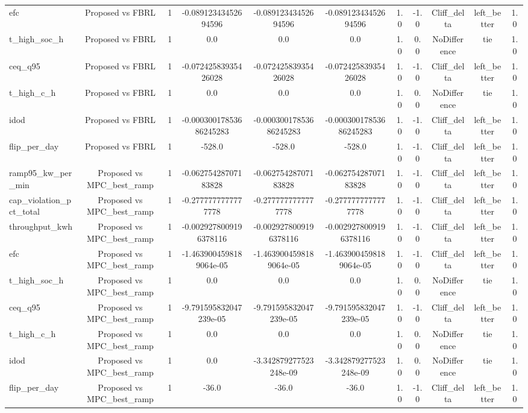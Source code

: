 \begin{table}[t]
\begin{tabular}{lcccccccccc}
efc & Proposed vs FBRL & 1 & -0.08912343452694596 & -0.08912343452694596 & -0.08912343452694596 & 1.0 & -1.0 & Cliff\_delta & left\_better & 1.0 \\
t\_high\_soc\_h & Proposed vs FBRL & 1 & 0.0 & 0.0 & 0.0 & 1.0 & 0.0 & NoDifference & tie & 1.0 \\
ceq\_q95 & Proposed vs FBRL & 1 & -0.07242583935426028 & -0.07242583935426028 & -0.07242583935426028 & 1.0 & -1.0 & Cliff\_delta & left\_better & 1.0 \\
t\_high\_c\_h & Proposed vs FBRL & 1 & 0.0 & 0.0 & 0.0 & 1.0 & 0.0 & NoDifference & tie & 1.0 \\
idod & Proposed vs FBRL & 1 & -0.00030017853686245283 & -0.00030017853686245283 & -0.00030017853686245283 & 1.0 & -1.0 & Cliff\_delta & left\_better & 1.0 \\
flip\_per\_day & Proposed vs FBRL & 1 & -528.0 & -528.0 & -528.0 & 1.0 & -1.0 & Cliff\_delta & left\_better & 1.0 \\
ramp95\_kw\_per\_min & Proposed vs MPC\_best\_ramp & 1 & -0.06275428707183828 & -0.06275428707183828 & -0.06275428707183828 & 1.0 & -1.0 & Cliff\_delta & left\_better & 1.0 \\
cap\_violation\_pct\_total & Proposed vs MPC\_best\_ramp & 1 & -0.2777777777777778 & -0.2777777777777778 & -0.2777777777777778 & 1.0 & -1.0 & Cliff\_delta & left\_better & 1.0 \\
throughput\_kwh & Proposed vs MPC\_best\_ramp & 1 & -0.0029278009196378116 & -0.0029278009196378116 & -0.0029278009196378116 & 1.0 & -1.0 & Cliff\_delta & left\_better & 1.0 \\
efc & Proposed vs MPC\_best\_ramp & 1 & -1.4639004598189064e-05 & -1.4639004598189064e-05 & -1.4639004598189064e-05 & 1.0 & -1.0 & Cliff\_delta & left\_better & 1.0 \\
t\_high\_soc\_h & Proposed vs MPC\_best\_ramp & 1 & 0.0 & 0.0 & 0.0 & 1.0 & 0.0 & NoDifference & tie & 1.0 \\
ceq\_q95 & Proposed vs MPC\_best\_ramp & 1 & -9.791595832047239e-05 & -9.791595832047239e-05 & -9.791595832047239e-05 & 1.0 & -1.0 & Cliff\_delta & left\_better & 1.0 \\
t\_high\_c\_h & Proposed vs MPC\_best\_ramp & 1 & 0.0 & 0.0 & 0.0 & 1.0 & 0.0 & NoDifference & tie & 1.0 \\
idod & Proposed vs MPC\_best\_ramp & 1 & 0.0 & -3.342879277523248e-09 & -3.342879277523248e-09 & 1.0 & 0.0 & NoDifference & tie & 1.0 \\
flip\_per\_day & Proposed vs MPC\_best\_ramp & 1 & -36.0 & -36.0 & -36.0 & 1.0 & -1.0 & Cliff\_delta & left\_better & 1.0 \\

\end{tabular}
\end{table}
